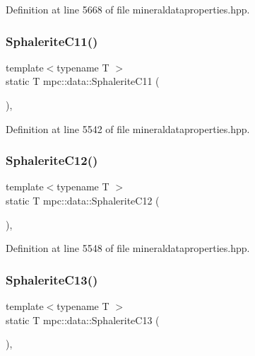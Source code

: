 Definition at line 5668 of file mineraldataproperties.\+hpp.

\mbox{\label{namespacempc_1_1data_a225171780fdfe5996111a1caa9ddce8d}} 
\subsubsection{\texorpdfstring{Sphalerite\+C11()}{SphaleriteC11()}}
{\footnotesize\ttfamily template$<$typename T $>$ \\
static T mpc\+::data\+::\+Sphalerite\+C11 (\begin{DoxyParamCaption}{ }\end{DoxyParamCaption})\hspace{0.3cm}{\ttfamily [inline]}, {\ttfamily [static]}}



Definition at line 5542 of file mineraldataproperties.\+hpp.

\mbox{\label{namespacempc_1_1data_a151af0de9d727bfb6117522da41cb437}} 
\subsubsection{\texorpdfstring{Sphalerite\+C12()}{SphaleriteC12()}}
{\footnotesize\ttfamily template$<$typename T $>$ \\
static T mpc\+::data\+::\+Sphalerite\+C12 (\begin{DoxyParamCaption}{ }\end{DoxyParamCaption})\hspace{0.3cm}{\ttfamily [inline]}, {\ttfamily [static]}}



Definition at line 5548 of file mineraldataproperties.\+hpp.

\mbox{\label{namespacempc_1_1data_a4e55f6264c75003a06e51a0c982761c9}} 
\subsubsection{\texorpdfstring{Sphalerite\+C13()}{SphaleriteC13()}}
{\footnotesize\ttfamily template$<$typename T $>$ \\
static T mpc\+::data\+::\+Sphalerite\+C13 (\begin{DoxyParamCaption}{ }\end{DoxyParamCaption})\hspace{0.3cm}{\ttfamily [inline]}, {\ttfamily [static]}}



